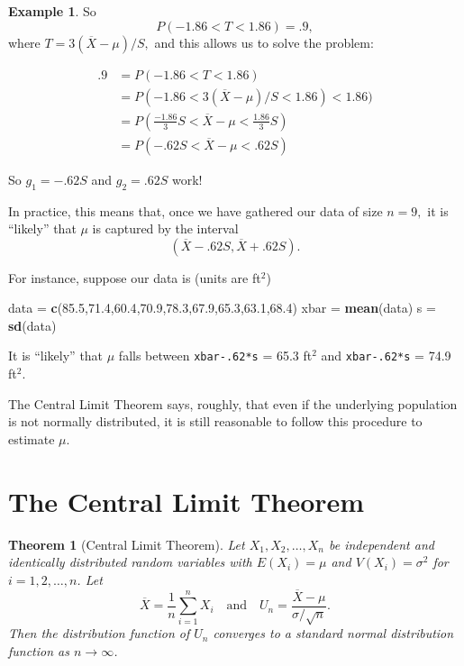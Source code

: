 \documentclass[
]{book}
\newenvironment{Shaded}{\begin{snugshade}}{\end{snugshade}}
\newcommand{\FloatTok}[1]{\textcolor[rgb]{0.00,0.00,0.81}{#1}}
\newcommand{\FunctionTok}[1]{\textcolor[rgb]{0.13,0.29,0.53}{\textbf{#1}}}
\newcommand{\NormalTok}[1]{#1}
\newcommand{\OtherTok}[1]{\textcolor[rgb]{0.56,0.35,0.01}{#1}}
\newtheorem{theorem}{Theorem}[chapter]
\theoremstyle{definition}
\theoremstyle{definition}
\newtheorem{example}{Example}[chapter]
\theoremstyle{definition}
\theoremstyle{definition}
\theoremstyle{remark}
\begin{document}
\begin{example}
So \[P(-1.86 < T < 1.86) = .9,\]
where \(T = 3(\overline{X}-\mu)/S,\) and this allows us to solve the problem:

\begin{align*}
.9 &= P(-1.86 < T < 1.86)\\
    &= P(-1.86 < 3(\overline{X}-\mu)/S < 1.86) < 1.86) \\
    &= P(\frac{-1.86}{3}S < \overline{X}-\mu < \frac{1.86}{3}S )\\
    &= P(-.62 S < \overline{X}-\mu < .62 S)
\end{align*}

So \(g_1 = -.62S\) and \(g_2 = .62S\) work!

In practice, this means that, once we have gathered our data of size \(n = 9,\) it is ``likely'' that \(\mu\) is captured by the interval \[(\overline{X} - .62S, \overline{X} + .62S).\]

For instance, suppose our data is (units are ft\(^2\))

\begin{Shaded}
\begin{Highlighting}[]
\NormalTok{data }\OtherTok{=} \FunctionTok{c}\NormalTok{(}\FloatTok{85.5}\NormalTok{,}\FloatTok{71.4}\NormalTok{,}\FloatTok{60.4}\NormalTok{,}\FloatTok{70.9}\NormalTok{,}\FloatTok{78.3}\NormalTok{,}\FloatTok{67.9}\NormalTok{,}\FloatTok{65.3}\NormalTok{,}\FloatTok{63.1}\NormalTok{,}\FloatTok{68.4}\NormalTok{)}
\NormalTok{xbar }\OtherTok{=} \FunctionTok{mean}\NormalTok{(data)}
\NormalTok{s }\OtherTok{=} \FunctionTok{sd}\NormalTok{(data)}
\end{Highlighting}
\end{Shaded}

It is ``likely'' that \(\mu\) falls between \texttt{xbar-.62*s} = 65.3 ft\(^2\) and \texttt{xbar-.62*s} = 74.9 ft\(^2\).
\end{example}

The Central Limit Theorem says, roughly, that even if the underlying population is not normally distributed, it is still reasonable to follow this procedure to estimate \(\mu\).

\section{The Central Limit Theorem}\label{the-central-limit-theorem}

\begin{theorem}[Central Limit Theorem]
\protect\hypertarget{thm:clt}{}\label{thm:clt}Let \(X_1, X_2, \ldots, X_n\) be independent and identically distributed random variables with \(E(X_i) = \mu\) and \(V(X_i) = \sigma^2\) for \(i = 1,2,\ldots,n\). Let \[\overline{X} = \frac{1}{n}\sum_{i=1}^n X_i ~~~ \text{ and } ~~~ U_n = \frac{\overline{X}-\mu}{\sigma/\sqrt{n}}.\]
Then the distribution function of \(U_n\) converges to a standard normal distribution function as \(n \to \infty\).
\end{theorem}
\end{document}
